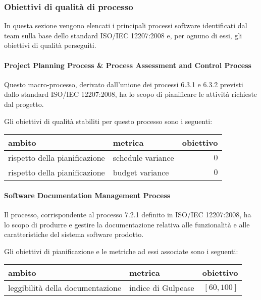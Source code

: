 		\subsubsection{Obiettivi di qualità di processo} \label{sec:ob_qual_proc}
		In questa sezione vengono elencati i principali processi software identificati dal team sulla base dello standard ISO/IEC 12207:2008 e, per ognuno di essi, gli obiettivi di qualità perseguiti.

\paragraph{Project Planning Process \& Process Assessment and Control Process}
Questo macro-processo, derivato dall'unione dei processi 6.3.1 e 6.3.2 previsti dallo standard ISO/IEC 12207:2008, ha lo scopo di pianificare le attività richieste dal progetto.

Gli obiettivi di qualità stabiliti per questo processo sono i seguenti:
\begin{center}
\begin{tabular}{| l | p{6cm} | r |}
	\hline
	\textbf{ambito} & \textbf{metrica} & \textbf{obiettivo} \\
	\hline
	rispetto della pianificazione & schedule variance & $0$ \\
	\hline
	rispetto della pianificazione & budget variance & $0$ \\
	\hline
\end{tabular}
\end{center}

\paragraph{Software Documentation Management Process}
Il processo, corrispondente al processo 7.2.1 definito in ISO/IEC 12207:2008, ha lo scopo di produrre e gestire la documentazione relativa alle funzionalità e alle caratteristiche del sistema software prodotto.

Gli obiettivi di pianificazione e le metriche ad essi associate sono i seguenti:
\begin{center}
\begin{tabular}{| l | l | r |}
	\hline
	\textbf{ambito} & \textbf{metrica} & \textbf{obiettivo} \\
	\hline
	leggibilità della documentazione & indice di Gulpease & $[60, 100]$ \\
	\hline
\end{tabular}
\end{center}


